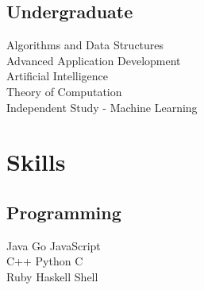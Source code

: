 \documentclass[letterpaper]{deedy-resume} %
\begin{document}
\begin{minipage}[t]{0.33\textwidth}
\subsection{Undergraduate}

Algorithms and Data Structures \\
Advanced Application Development \\
Artificial Intelligence \\
Theory of Computation \\
Independent Study - Machine Learning \\

\sectionspace %


\section{Skills}

\subsection{Programming}

Java \textbullet{} Go \textbullet{} JavaScript  \\
 C++ \textbullet{} Python \textbullet{} C \ \\ 
\sectionspace %
Ruby \textbullet{} Haskell \textbullet{} Shell  \\

\sectionspace %


\end{minipage} %




\end{document}

